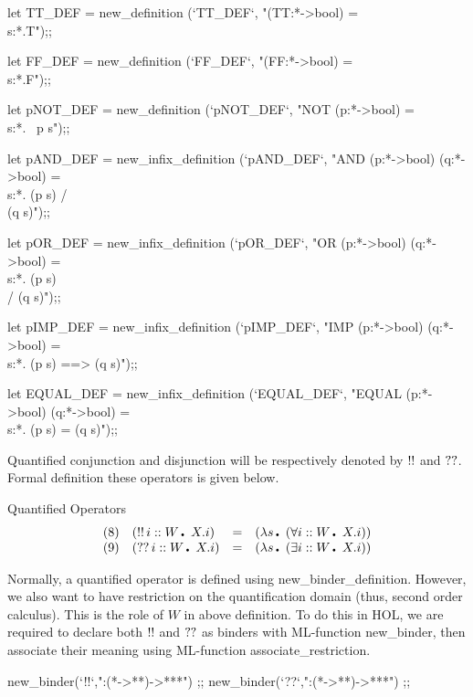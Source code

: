 \enddocs
{}
\endmoddef
let TT_DEF = new_definition (`TT_DEF`, "(TT:*->bool) = \\s:*.T");;

let FF_DEF = new_definition (`FF_DEF`, "(FF:*->bool) = \\s:*.F");;

let pNOT_DEF = new_definition (`pNOT_DEF`, "NOT (p:*->bool) = \\s:*. ~p s");;

let pAND_DEF = new_infix_definition (`pAND_DEF`, 
    "AND (p:*->bool) (q:*->bool) = \\s:*. (p s) /\\ (q s)");;

let pOR_DEF = new_infix_definition (`pOR_DEF`, 
    "OR (p:*->bool) (q:*->bool) = \\s:*. (p s) \\/ (q s)");;

let pIMP_DEF = new_infix_definition (`pIMP_DEF`, 
    "IMP (p:*->bool) (q:*->bool) = \\s:*. (p s) ==> (q s)");;

let EQUAL_DEF = new_infix_definition (`EQUAL_DEF`, 
    "EQUAL (p:*->bool) (q:*->bool) = \\s:*. (p s) = (q s)");;
\endcode
{}


Quantified conjunction and disjunction will be respectively denoted by
$\mathop{!!}$ and $\mathop{??}$.  Formal definition these operators is given below.

\begin{definition}{Quantified Operators}
\[ \begin{array}{llcl}
   (8) & (\pA i::W\Dot X.i) & = & (\lambda s\Dot  (\qA i::W\Dot  X.i)) \\
   (9) & (\pE i::W\Dot  X.i) & = & (\lambda s\Dot  (\qE i::W\Dot X.i)) 
   \end{array} \]
\end{definition}

Normally, a quantified operator is defined using
\code{}new_binder_definition\edoc{}. However, we also want to have restriction
on the quantification domain (thus, second order calculus). This is
the role of $W$ in above definition. To do this in HOL, we are
required to declare both $\mathop{!!}$ and $\mathop{??}$ as binders with ML-function
\code{}new_binder\edoc{}, then associate their meaning using ML-function
\code{}associate_restriction\edoc{}.

\enddocs
{}
\endmoddef
new_binder(`!!`,":(*->**)->***") ;;
new_binder(`??`,":(*->**)->***") ;;


